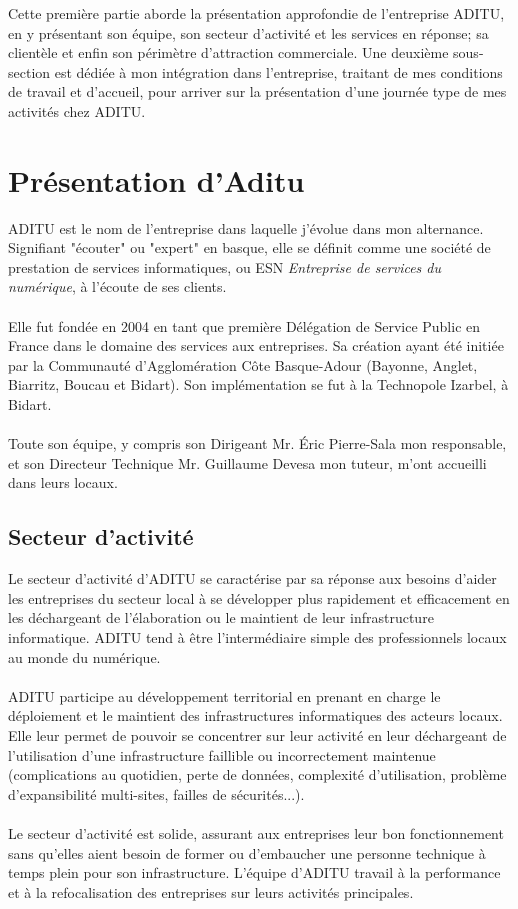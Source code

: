 \renewcommand{\figurename}{}

Cette première partie aborde la présentation approfondie de l'entreprise ADITU, en y présentant son équipe, son secteur d'activité et les services en réponse; sa clientèle et enfin son périmètre d'attraction commerciale. Une deuxième sous-section est dédiée à mon intégration dans l'entreprise, traitant de mes conditions de travail et d'accueil, pour arriver sur la présentation d'une journée type de mes activités chez ADITU.

\section{Présentation d'Aditu}

ADITU est le nom de l'entreprise dans laquelle j'évolue dans mon alternance. Signifiant "écouter" ou "expert" en basque, elle se définit comme une société de prestation de services informatiques, ou ESN \textit{Entreprise de services du numérique}, à l'écoute de ses clients.
\\ \\
Elle fut fondée en 2004 en tant que première Délégation de Service Public en France dans le domaine des services aux entreprises. Sa création ayant été initiée par la Communauté d’Agglomération Côte Basque-Adour (Bayonne, Anglet, Biarritz, Boucau et Bidart). Son implémentation se fut à la Technopole Izarbel, à Bidart.
\\ \\
Toute son équipe, y compris son Dirigeant  Mr. Éric Pierre-Sala mon responsable, et son Directeur Technique Mr. Guillaume Devesa mon tuteur, m'ont accueilli dans leurs locaux.

\subsection{Secteur d'activité}

Le secteur d'activité d'ADITU se caractérise par sa réponse aux besoins d'aider les entreprises du secteur local à se développer plus rapidement et efficacement en les déchargeant de l'élaboration ou le maintient de leur infrastructure informatique. ADITU tend à être l'intermédiaire simple des professionnels locaux au monde du numérique.
\\ \\
ADITU participe au développement territorial en prenant en charge le déploiement et le maintient des infrastructures informatiques des acteurs locaux. Elle leur permet de pouvoir se concentrer sur leur activité en leur déchargeant de l'utilisation d'une infrastructure faillible ou incorrectement maintenue (complications au quotidien, perte de données, complexité d'utilisation, problème d'expansibilité multi-sites, failles de sécurités...).  
\\ \\
Le secteur d'activité est solide, assurant aux entreprises leur bon fonctionnement sans qu'elles aient besoin de former ou d'embaucher une personne technique à temps plein pour son infrastructure. L'équipe d'ADITU travail à la performance et à la refocalisation des entreprises sur leurs activités principales.


